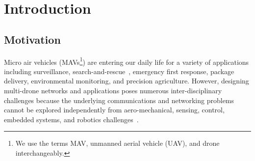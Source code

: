 \chapter{Introduction}\label{chap:intro}

\section{Motivation}\label{sec:ch1:intro}
Micro air vehicles (MAVs\footnote{We use the terms MAV, unmanned aerial vehicle (UAV), and drone interchangeably.}) are entering our daily life for a variety of applications including surveillance, search-and-rescue~\cite{modares-icra17}, emergency first response, package delivery, environmental monitoring, and precision agriculture.
However, designing multi-drone networks and applications poses numerous inter-disciplinary challenges because the underlying communications and networking problems cannot be explored independently from aero-mechanical, sensing, control, embedded systems, and robotics challenges~\cite{jmod2016poster, jmod2016demo}.
